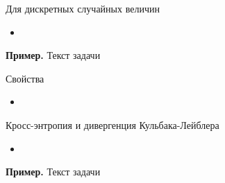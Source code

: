 \documentclass[final]{beamer}
\newlength{\sepwid}
\newlength{\onecolwid}
\newlength{\twocolwid}
\begin{document}
\begin{frame}[t]
\begin{columns}[t]
\begin{column}{\onecolwid}
\begin{block}{Для дискретных случайных величин}
\begin{itemize}
    \item 
\end{itemize}

\textbf{Пример.} Текст задачи
\end{block}

\begin{alertblock}{Свойства}
	\begin{itemize}
		\item 
	\end{itemize}
	
\end{alertblock}

\begin{block}{Кросс-энтропия и дивергенция Кульбака-Лейблера}
	\begin{itemize}
		\item 
	\end{itemize}

\textbf{Пример.} Текст задачи
\end{block}




\end{column} %

\begin{column}{\sepwid}\end{column} %

\begin{column}{\twocolwid} %

\begin{columns}[t,totalwidth=\twocolwid] %

\begin{column}{\onecolwid}\vspace{-.6in} %



\end{column}
\end{columns}
\end{column}
\end{columns}
\end{frame}
\end{document}
